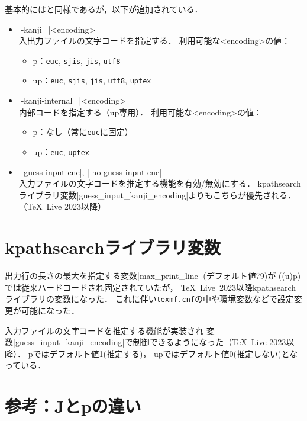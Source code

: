 \documentclass[a4paper,11pt,nomag,dvipdfmx]{jsarticle}
\def\code#1{\texttt{#1}}
\def\file#1{\texttt{#1}}
\def\JBibTeX{\leavevmode\textcompwordmark\lower.5ex\hbox{J}\kern-.08em\BibTeX}
\def\pBibTeX{p\kern-.05em\BibTeX}
\def\upBibTeX{u\pBibTeX}
\def\JBibTeX{J\BibTeX}%
\def\pBibTeX{p\BibTeX}%
\def\upBibTeX{u\pBibTeX}%
\def\TL{\TeX\ Live}
\begin{document}
基本的には\BibTeX と同様であるが，以下が追加されている．
\begin{itemize}
 \item |-kanji=|<encoding>\\
   入出力ファイルの文字コードを指定する．
   利用可能な<encoding>の値：
   \begin{itemize}
    \item \pBibTeX ：\code{euc}, \code{sjis}, \code{jis}, \code{utf8}
    \item \upBibTeX ：\code{euc}, \code{sjis}, \code{jis}, \code{utf8}, \code{uptex}
   \end{itemize}
 \item |-kanji-internal=|<encoding>\\
   内部コードを指定する（\upBibTeX 専用）．
   利用可能な<encoding>の値：
   \begin{itemize}
    \item \pBibTeX ：なし（常に\code{euc}に固定）
    \item \upBibTeX ：\code{euc}, \code{uptex}
   \end{itemize}
 \item |-guess-input-enc|, |-no-guess-input-enc|\\
   入力ファイルの文字コードを推定する機能を有効/無効にする．
   kpathsearchライブラリ変数|guess_input_kanji_encoding|よりもこちらが優先される．（\TeX~Live 2023以降）
\end{itemize}


\section{kpathsearchライブラリ変数}\label{sec:kpathsearch}

出力行の長さの最大を指定する変数|max_print_line| (デフォルト値79)が
((u)p)\BibTeX では従来ハードコードされ固定されていたが，
\TL~2023以降kpathsearchライブラリの変数になった．
これに伴い\file{texmf.cnf}の中や環境変数などで設定変更が可能になった．

入力ファイルの文字コードを推定する機能が実装され
変数|guess_input_kanji_encoding|で制御できるようになった（\TeX~Live 2023以降）．
p\BibTeX ではデフォルト値1(推定する)，
up\BibTeX ではデフォルト値0(推定しない)となっている．

\section{参考：\JBibTeX と\pBibTeX の違い}\label{diff}
\end{document}
